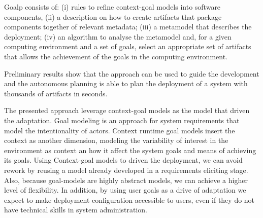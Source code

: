 
Goalp consists of: (i) rules to refine context-goal models into software components, (ii) a description on how to create artifacts that package components together of relevant metadata; (iii) a metamodel that describes the deployment; (iv) an algorithm to analyse the metamodel and, for a given computing environment and a set of goals, select an appropriate set of artifacts that allows the achievement of the goals in the computing environment.

Preliminary results show that the approach can be used to guide the development and the autonomous planning is able to plan the deployment of a system with thousands of artifacts in seconds.



The presented approach leverage context-goal models as the model that driven the adaptation. Goal modeling is an approach for system requirements that model the intentionality of actors.
Context runtime goal models insert the context as another dimension, modeling the variability of interest in the environment as context an how it affect the system goals and means of achieving its goals.
Using Context-goal models to driven the deployment, we can avoid rework by reusing a model already developed in a requirements eliciting stage. Also, because goal-models are highly abstract models, we can achieve a higher level of flexibility. In addition, by using user goals as a drive of adaptation we expect to make deployment configuration accessible to users, even if they do not have technical skills in system administration.

